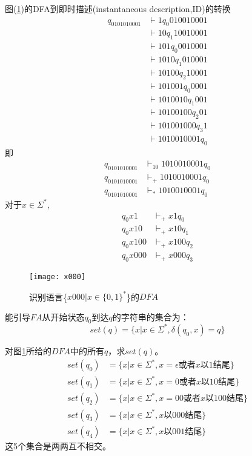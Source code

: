 \begin{example}
	图(\ref{fig:x000ID})的DFA到即时描述(instantaneous description,ID)的转换
	\begin{align*}
		q_0101010001 &\vdash 1 q_0 010010001 \\
		&\vdash 10 q_1 10010001 \\
		&\vdash 101 q_0 0010001 \\
		&\vdash 1010 q_1 010001 \\
		&\vdash 10100 q_2 10001 \\
		&\vdash 101001 q_0 0001 \\
		&\vdash 1010010 q_1 001 \\
		&\vdash 10100100 q_2 01 \\
		&\vdash 101001000 q_3 1 \\
		&\vdash 1010010001 q_0
	\end{align*}
	即
	\begin{align*}
		q_0101010001 &\vdash_{10}1010010001 q_0 \\
		q_0101010001 &\vdash_{+}1010010001 q_0 \\
		q_0101010001 &\vdash_{\ast}1010010001 q_0 
	\end{align*}
	对于$x\in\Sigma^{\ast}$,
	\begin{align*}
	q_0x1 &\vdash_{+}x1q_0     \\
	q_0x10 &\vdash_{+}x10q_1   \\
	q_0x100 &\vdash_{+}x100q_2 \\
	q_0x000 &\vdash_{+}x000q_3 
	\end{align*}
	
	\begin{figure}[htbp]
		\texttt{[image: x000]}
		\caption{识别语言\{$x000|x\in\{0,1\}^{\ast}$\}的$DFA$}
		\label{fig:x000ID}       %
	\end{figure}
\end{example}

能引导$FA$从开始状态$q_0$到达$q$的字符串的集合为：
\[set(q)=\{x|x\in\Sigma^{\ast},\delta(q_0,x)=q\}\]

\begin{example}
	对图\ref{fig:x000ID}所给的$DFA$中的所有$q$，求$set(q)$。
	\begin{align*}
		set(q_0) &=\{x|x\in\Sigma^{\ast},x=\epsilon\text{或者$x$以1结尾}\} \\
		set(q_1) &=\{x|x\in\Sigma^{\ast},x=0\text{或者$x$以10结尾}\} \\
		set(q_2) &=\{x|x\in\Sigma^{\ast},x=00\text{或者$x$以100结尾}\} \\
		set(q_3) &=\{x|x\in\Sigma^{\ast},\text{$x$以000结尾}\} \\
		set(q_4) &=\{x|x\in\Sigma^{\ast},\text{$x$以001结尾}\}
	\end{align*}
	这5个集合是两两互不相交。
\end{example}

